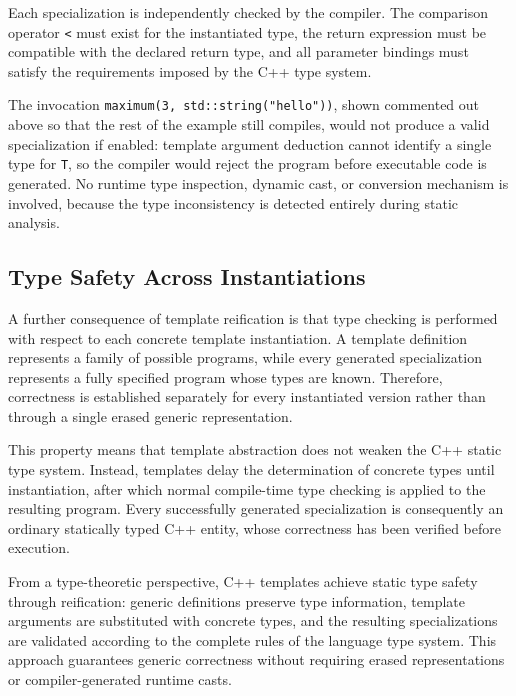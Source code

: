 \documentclass[11pt]{report}
\begin{document}
Each specialization is independently checked by the compiler. The comparison
operator \texttt{<} must exist for the instantiated type, the return
expression must be compatible with the declared return type, and all
parameter bindings must satisfy the requirements imposed by the C++ type
system.

The invocation \texttt{maximum(3, std::string("hello"))}, shown commented out above so
that the rest of the example still compiles, would not produce a valid
specialization if enabled: template argument deduction cannot identify a
single type for \texttt{T}, so the compiler would reject the program before
executable code is generated. No runtime type inspection,
dynamic cast, or conversion mechanism is involved, because the type
inconsistency is detected entirely during static analysis.

\subsection{Type Safety Across Instantiations}

A further consequence of template reification is that type checking is
performed with respect to each concrete template instantiation. A template
definition represents a family of possible programs, while every generated
specialization represents a fully specified program whose types are known.
Therefore, correctness is established separately for every instantiated
version rather than through a single erased generic representation.

This property means that template abstraction does not weaken the C++ static
type system. Instead, templates delay the determination of concrete types
until instantiation, after which normal compile-time type checking is
applied to the resulting program. Every successfully generated specialization
is consequently an ordinary statically typed C++ entity, whose correctness
has been verified before execution.

From a type-theoretic perspective, C++ templates achieve static type safety
through reification: generic definitions preserve type information, template
arguments are substituted with concrete types, and the resulting
specializations are validated according to the complete rules of the language
type system. This approach guarantees generic correctness without requiring
erased representations or compiler-generated runtime casts.

\end{document}
